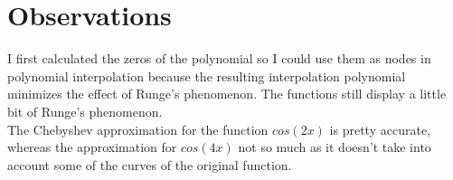 \documentclass{article}
\begin{document}
\section{Observations}
I first calculated the zeros of the polynomial so I could use them as nodes in polynomial interpolation because the resulting interpolation polynomial minimizes the effect of Runge's phenomenon. The functions still display a little bit of Runge's phenomenon. \\

The Chebyshev approximation for the function $cos(2x)$ is pretty accurate, whereas the approximation for $cos(4x)$ not so much as it doesn't take into account some of the curves of the original function.
\end{document}
